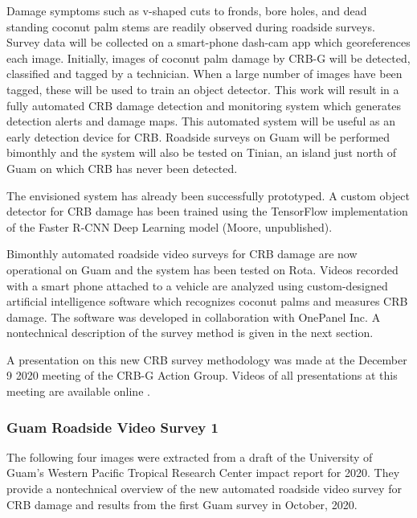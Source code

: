 \documentclass[12pt,letterpaper,english,bibliography=totocnumbered, abstract=on]{scrartcl}
\begin{document}
\begin{framed}
Damage symptoms such as v-shaped cuts to fronds, bore holes, and dead standing coconut palm stems are readily observed during roadside surveys. Survey data will be collected on a smart-phone dash-cam app which georeferences each image. Initially, images of coconut palm damage by CRB-G will be detected, classified and tagged by a technician. When a large number of images have been tagged, these will be used to train an object detector. This work will result in a fully automated CRB damage detection and monitoring system which generates detection alerts and damage maps. This automated system will be useful as an early detection device for CRB. Roadside surveys on Guam will be performed bimonthly and the system will also be tested on Tinian, an island just north of Guam on which CRB has never been detected.

The envisioned system has already been successfully prototyped. A custom object detector for CRB damage has been trained using the TensorFlow implementation of the Faster R-CNN Deep Learning model (Moore, unpublished).
\end{framed}

Bimonthly automated roadside video surveys for CRB damage are now operational on Guam and the system has been tested on Rota. Videos recorded with a smart phone attached to a vehicle are analyzed using custom-designed artificial intelligence software which recognizes coconut palms and measures CRB damage. The software was developed in collaboration with OnePanel Inc. A nontechnical description of the survey method is given in the next section.

A presentation on this new CRB survey methodology was made at the December 9 2020 meeting of the CRB-G Action Group. Videos of all presentations at this meeting are available online \cite{mooreVideoRecordingCRBG2020}.

\clearpage
\subsubsection{Guam Roadside Video Survey 1}

The following four images were extracted from a draft of the University of Guam's Western Pacific Tropical Research Center impact report for 2020. They provide a nontechnical overview of the new automated roadside video survey for CRB damage and results from the first Guam survey in October, 2020.
\end{document}

